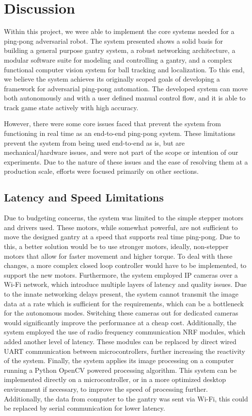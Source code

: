 \chapter{Discussion}
Within this project, we were able to implement the core systems needed for a ping-pong adversarial robot. The system presented shows a solid basis for building a general purpose gantry system, a robust networking architecture, a modular software suite for modeling and controlling a gantry, and a complex functional computer vision system for ball tracking and localization. To this end, we believe the system achieves its originally scoped goals of developing a framework for adversarial ping-pong automation. The developed system can move both autonomously and with a user defined manual control flow, and it is able to track game state actively with high accuracy.

 However, there were some core issues faced that prevent the system from functioning in real time as an end-to-end ping-pong system. These limitations prevent the system from being used end-to-end as is, but are mechanical/hardware issues, and were not part of the scope or intention of our experiments. Due to the nature of these issues and the ease of resolving them at a production scale, efforts were focused primarily on other sections.

\section{Latency and Speed Limitations}
Due to budgeting concerns, the system was limited to the simple stepper motors and drivers used. These motors, while somewhat powerful, are not sufficient to move the designed gantry at a speed that supports real time ping-pong. Due to this, a better solution would be to use stronger motors, ideally, non-stepper motors that allow for faster movement and higher torque. To deal with these changes, a more complex closed loop controller would have to be implemented, to support the new motors.
Furthermore, the system employed IP cameras over a Wi-Fi network, which introduce multiple layers of latency and quality issues. Due to the innate networking delays present, the system cannot transmit the image data at a rate which is sufficient for the requirements, which can be a bottleneck for the autonomous modes. Switching these cameras out for dedicated cameras would significantly improve the performance at a cheap cost.
Additionally, the system employed the use of radio frequency communication NRF modules, which added another level of latency. These modules can be replaced by direct wired UART communication between microcontrollers, further increasing the reactivity of the system.
Finally, the system applies its image processing on a computer running a Python OpenCV powered processing algorithm. This system can be implemented directly on a microcontroller, or in a more optimized desktop environment if necessary, to improve the speed of processing further. Additionally, the data from computer to the gantry was sent via Wi-Fi, this could be replaced by serial communication for lower latency.

